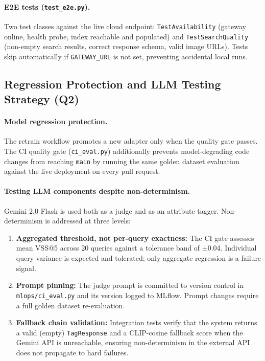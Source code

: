 \documentclass[12pt]{article}
\begin{document}
\paragraph{E2E tests (\texttt{test\_e2e.py}).}
Two test classes against the live cloud endpoint: \texttt{TestAvailability} (gateway online, health probe, index reachable and populated) and \texttt{TestSearchQuality} (non-empty search results, correct response schema, valid image URLs). Tests skip automatically if \texttt{GATEWAY\_URL} is not set, preventing accidental local runs.

\subsection{Regression Protection and LLM Testing Strategy (Q2)}

\paragraph{Model regression protection.}
The retrain workflow promotes a new adapter only when the quality gate passes. The CI quality gate (\texttt{ci\_eval.py}) additionally prevents model-degrading code changes from reaching \texttt{main} by running the same golden dataset evaluation against the live deployment on every pull request.

\paragraph{Testing LLM components despite non-determinism.}
Gemini 2.0 Flash is used both as a judge and as an attribute tagger. Non-determinism is addressed at three levels:

\begin{enumerate}[leftmargin=*]
  \item \textbf{Aggregated threshold, not per-query exactness:} The CI gate assesses mean VSS@5 across 20 queries against a tolerance band of $\pm$0.04. Individual query variance is expected and tolerated; only aggregate regression is a failure signal.
  \item \textbf{Prompt pinning:} The judge prompt is committed to version control in \texttt{mlops/ci\_eval.py} and its version logged to MLflow. Prompt changes require a full golden dataset re-evaluation.
  \item \textbf{Fallback chain validation:} Integration tests verify that the system returns a valid (empty) \texttt{TagResponse} and a CLIP-cosine fallback score when the Gemini API is unreachable, ensuring non-determinism in the external API does not propagate to hard failures.
\end{enumerate}
\end{document}

